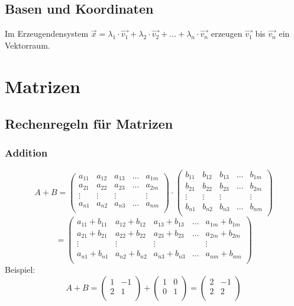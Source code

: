 \subsection{Basen und Koordinaten}
Im Erzeugendensystem $\vec{x} = \lambda_1 \cdot \vec{v_1} + \lambda_2
\cdot \vec{v_2} + \dots + \lambda_n \cdot \vec{v_n}$ erzeugen
$\vec{v_1}$ bis $\vec{v_n}$ ein Vektorraum.


\section{Matrizen}
\subsection{Rechenregeln für Matrizen}
\subsubsection{Addition}
\[ A + B =
  \begin {pmatrix}
    a_{11} & a_{12} & a_{13} & \hdots & a_{1m} \\
    a_{21} & a_{22} & a_{23} & \hdots & a_{2m} \\
    \vdots  & \vdots  & \vdots  &        & \vdots  \\
    a_{n1} & a_{n2} & a_{n3} & \hdots & a_{nm} \\
  \end {pmatrix} \cdot 
  \begin {pmatrix}
    b_{11} & b_{12} & b_{13} & \hdots & b_{1m} \\
    b_{21} & b_{22} & b_{23} & \hdots & b_{2m} \\
    \vdots  & \vdots  & \vdots  &        & \vdots  \\
    b_{n1} & b_{n2} & b_{n3} & \hdots & b_{nm} \\
  \end {pmatrix} \]
\[ = \begin {pmatrix}
    a_{11} + b_{11} & a_{12} + b_{12} & a_{13} + b_{13} & \hdots &
      a_{1m} + b_{1m} \\
    a_{21} + b_{21} & a_{22} + b_{22} & a_{23} + b_{23} & \hdots &
      a_{2m} + b_{2m} \\
    \vdots  & \vdots  & \vdots  &        & \vdots  \\
    a_{n1} + b_{n1} & a_{n2} + b_{n2} & a_{n3} + b_{n3} & \hdots &
    a_{nm} + b_{nm} \\
  \end {pmatrix} \]
Beispiel:
\[ A + B =
  \begin {pmatrix} 1 & -1 \\ 2 & 1 \\ \end {pmatrix} +
  \begin {pmatrix} 1 & 0 \\ 0 & 1 \\ \end {pmatrix} =
  \begin {pmatrix} 2 & -1 \\ 2 & 2 \\ \end {pmatrix} 
\]

